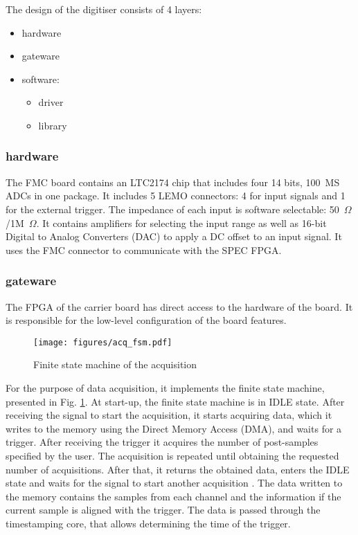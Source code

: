         The design of the digitiser consists of 4 layers:
        \begin{itemize}
            \item hardware
            \item gateware
            \item software:
            \begin{itemize}
                \item driver
                \item library
            \end{itemize}
        \end{itemize}
        
        \subsubsection{hardware}
            The FMC board contains an LTC2174 \cite{datasheet:LTC2174} chip that includes four 14 bits, 100~MS ADCs in one package. It includes 5 LEMO connectors: 4 for input signals and 1 for the external trigger. The impedance of each input is software selectable: 50~$\Omega$/1M~$\Omega$. It contains amplifiers for selecting the input range as well as 16-bit Digital to Analog Converters (DAC) to apply a DC offset to an input signal. It uses the FMC connector to communicate with the SPEC FPGA.
        
        \subsubsection{gateware}
            The FPGA of the carrier board has direct access to the hardware of the board. It is responsible for the low-level configuration of the board features.
            
            \begin{figure}
            	\centerline{\texttt{[image: figures/acq\_fsm.pdf]}}
            	\caption{Finite state machine of the acquisition}
            	\label{fig:acq_fsm}
            \end{figure}
            
            For the purpose of data acquisition, it implements the finite state machine, presented in Fig. \ref{fig:acq_fsm}. At start-up, the finite state machine is in IDLE state. After receiving the signal to start the acquisition, it starts acquiring data, which it writes to the memory using the Direct Memory Access (DMA), and waits for a trigger. After receiving the trigger it acquires the number of post-samples specified by the user. The acquisition is repeated until obtaining the requested number of acquisitions. After that, it returns the obtained data, enters the IDLE state and waits for the signal to start another acquisition \cite{fmc_adc_gateware_guide}. 
            The data written to the memory contains the samples from each channel and the information if the current sample is aligned with the trigger. The data is passed through the timestamping core, that allows determining the time of the trigger.
        
